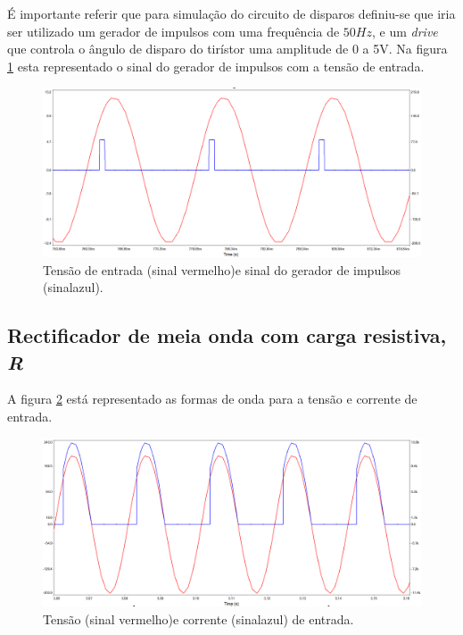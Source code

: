 \documentclass[a4paper,11pt]{article}
\numberwithin{equation}{section}
\begin{document}
É importante referir que para simulação do circuito de disparos definiu-se que iria ser utilizado um gerador de impulsos com uma frequência   de $50Hz$, e um \textit{drive} que controla o ângulo de disparo do tirístor uma amplitude de 0 a 5V. Na figura \ref{fig:circuit_6} esta representado o sinal do gerador de impulsos com a tensão de entrada.

\begin{figure}[h]
	\centering
	\includegraphics[keepaspectratio=true, scale=0.35]{img/circuito4}
	\caption{Tensão de entrada (sinal vermelho)e sinal do gerador de impulsos (sinalazul).}
	\label{fig:circuit_6}
	\vspace{-0.8em}
\end{figure}

\pagebreak
\subsection{Rectificador de meia onda com carga resistiva, \textit{R}}

A figura \ref{fig:circuit_7}  está representado as formas de onda para a tensão e corrente de entrada.

\begin{figure}[h]
	\centering
	\includegraphics[keepaspectratio=true, scale=0.3]{img/circuito5}
	\caption{Tensão (sinal vermelho)e corrente (sinalazul) de entrada.}
	\label{fig:circuit_7}
	\vspace{-0.8em}
\end{figure}
\end{document}
